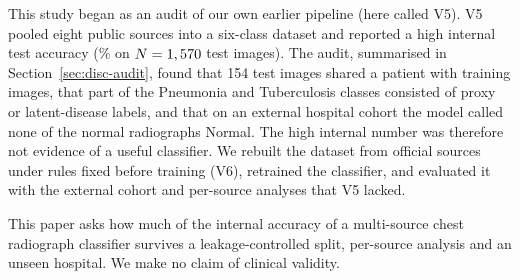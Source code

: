 This study began as an audit of our own earlier pipeline (here called V5). V5 pooled eight public sources into a six-class dataset and reported a high internal test accuracy (\RVFiveAcc\% on $N=1,570$ test images). The audit, summarised in Section~\ref{sec:disc-audit}, found that 154 test images shared a patient with training images, that part of the Pneumonia and Tuberculosis classes consisted of proxy or latent-disease labels, and that on an external hospital cohort the model called none of the \RVFiveExtSpecN{} normal radiographs Normal. The high internal number was therefore not evidence of a useful classifier. We rebuilt the dataset from official sources under rules fixed before training (V6), retrained the classifier, and evaluated it with the external cohort and per-source analyses that V5 lacked.

This paper asks how much of the internal accuracy of a multi-source chest radiograph classifier survives a leakage-controlled split, per-source analysis and an unseen hospital. We make no claim of clinical validity.

